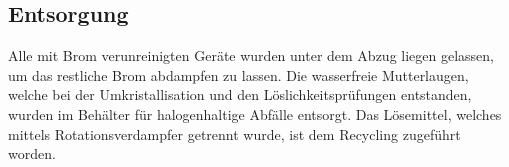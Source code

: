 \subsection*{Entsorgung}
Alle mit Brom verunreinigten Geräte wurden unter dem Abzug liegen gelassen, um das restliche Brom abdampfen zu lassen. Die wasserfreie Mutterlaugen, welche bei der Umkristallisation und den Löslichkeitsprüfungen entstanden, wurden im Behälter für halogenhaltige Abfälle entsorgt. Das Lösemittel, welches mittels Rotationsverdampfer getrennt wurde, ist dem Recycling zugeführt worden.
